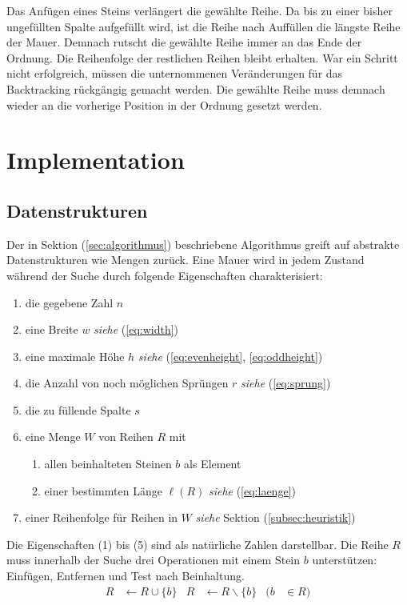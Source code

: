 \documentclass[a4paper, 12pt]{scrartcl}
\newcommand{\see}[1]{\hfill\emph{siehe} (\ref{#1})}
\begin{document}
Das Anfügen eines Steins verlängert die gewählte Reihe. Da bis zu einer bisher ungefüllten Spalte aufgefüllt wird, ist die Reihe nach Auffüllen die längste Reihe der Mauer. Demnach rutscht die gewählte Reihe immer an das Ende der Ordnung. Die Reihenfolge der restlichen Reihen bleibt erhalten. War ein Schritt nicht erfolgreich, müssen die unternommenen Veränderungen für das Backtracking rückgängig gemacht werden. Die gewählte Reihe muss demnach wieder an die vorherige Position in der Ordnung gesetzt werden.
\newpage
\section{Implementation}
\subsection{Datenstrukturen}
Der in Sektion (\ref{sec:algorithmus}) beschriebene Algorithmus greift auf abstrakte Datenstrukturen wie Mengen zurück. Eine Mauer wird in jedem Zustand während der Suche durch folgende Eigenschaften charakterisiert:
\begin{enumerate}
	\itemsep-2pt
	\item die gegebene Zahl $n$
	\item eine Breite $w$ \see{eq:width}
	\item eine maximale Höhe $h$ \hfill \emph{siehe} (\ref{eq:evenheight}, \ref{eq:oddheight})
	\item die Anzahl von noch möglichen Sprüngen $r$ \see{eq:sprung}
	\item die zu füllende Spalte $s$
	\item eine Menge $W$ von Reihen $R$ mit
	\begin{enumerate}
		\item allen beinhalteten Steinen $b$ als Element
		\item einer bestimmten Länge $\ell(R)$ \see{eq:laenge}
	\end{enumerate}
	\item einer Reihenfolge für Reihen in $W$  \emph{siehe} Sektion (\ref{subsec:heuristik})
\end{enumerate}
Die Eigenschaften (1) bis (5) sind als natürliche Zahlen darstellbar. Die Reihe $R$ muss innerhalb der Suche drei Operationen mit einem Stein $b$ unterstützen: Einfügen, Entfernen und Test nach Beinhaltung.
\begin{align*}
 	R &\leftarrow R\cup\{b\} & R &\leftarrow R\backslash\{b\} & (b &\in R)
\end{align*}
\end{document}
